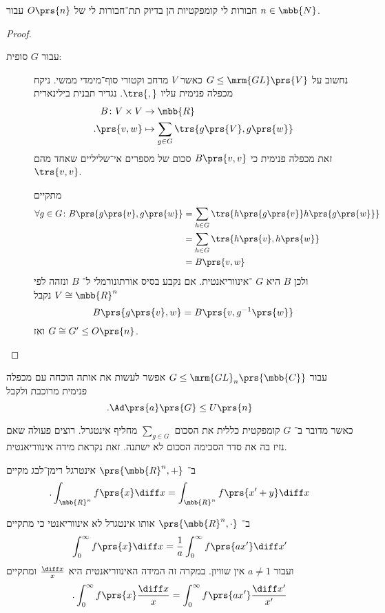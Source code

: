 \documentclass[10pt, twoside]{book}
\begin{document}
\begin{theorem}\label{theorem:main_compact_groups}
חבורות לי קומפקטיות הן בדיוק תת־חבורות לי של
$O\prs{n}$
עבור
$n \in \mbb{N}$.
\end{theorem}

\begin{proof}
\begin{description}
\item[עבור
$G$
סופית:]
נחשוב על
$G \leq \mrm{GL}\prs{V}$
כאשר
$V$
מרחב וקטורי סוף־מימדי ממשי.
ניקח מכפלה פנימית עליו
$\trs{,}$.
נגדיר תבנית בילינארית
\begin{align*}
B \colon V \times V &\to \mbb{R} \\
\text{.} \prs{v,w} &\mapsto \sum_{g \in G} \trs{g\prs{V}, g\prs{w}}
\end{align*}
זאת מכפלה פנימית כי
$B\prs{v,v}$
סכום של מספרים אי־שליליים שאחד מהם
$\trs{v,v}$.

מתקיים
\begin{align*}
\forall g \in G \colon B\prs{g\prs{v}, g\prs{w}} &= \sum_{h \in G} \trs{h\prs{g\prs{v}} h\prs{g\prs{w}}}
\\&= \sum_{h \in G} \trs{h\prs{v}, h\prs{w}}
\\&= B\prs{v,w}
\end{align*}
ולכן
$B$
היא
$G$%
־אינווריאנטית.
אם נקבע בסיס אורתונורמלי ל־%
$B$
ונזהה לפי
$V \cong \mbb{R}^n$
נקבל
\[B\prs{g\prs{v}, w} = B\prs{v, g^{-1}\prs{w}}\]
ואז
$G \cong G' \leq O\prs{n}$.
\end{description}
\end{proof}


\begin{remark}
עבור
$G \leq \mrm{GL}_n\prs{\mbb{C}}$
אפשר לעשות את אותה הוכחה עם מכפלה פנימית מרוכבת ולקבל
\[\text{.} \Ad\prs{a}\prs{G} \leq U\prs{n}\]

כאשר מדובר ב־%
$G$
קומפקטית כללית את הסכום
$\sum_{g \in G}$
מחליף אינטגרל. רוצים פעולה שאם נזיז בה את סדר הסכימה הסכום לא ישתנה.
זאת נקראת מידה אינווריאנטית.
\end{remark}

\begin{example}
ב־%
$\prs{\mbb{R}^n, +}$
אינטרגל רימן־לבג מקיים
\[\text{.}\int_{\mbb{R}^n} f\prs{x} \diff x = \int_{\mbb{R}^n} f \prs{x' + y} \diff x\]

ב־%
$\prs{\mbb{R}^n, \cdot}$
אותו אינטגרל לא אינווריאנטי כי מתקיים
\[\int_0^\infty f\prs{x} \diff x = \frac{1}{a} \int_0^\infty f\prs{a x'} \diff x'\]
ועבור
$a \neq 1$
אין שוויון.
במקרה זה המידה האינווריאנטית היא
$\frac{\diff x}{x}$
ומתקיים
\[\text{.} \int_0^\infty f\prs{x} \frac{\diff x}{x} = \int_0^\infty f\prs{a x'} \frac{\diff x'}{x'}\]
\end{example}
\end{document}
